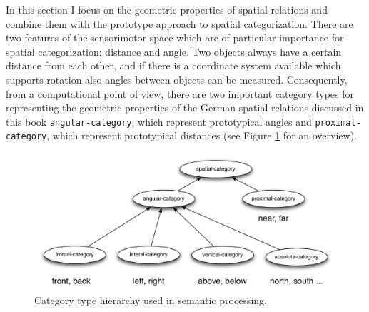 In this section I focus on the geometric properties of spatial relations 
and combine them with the prototype approach to spatial categorization. 
There are two features of the sensorimotor space which are of particular
importance for spatial categorization: distance and angle. Two objects 
always have a certain distance from each other, and if there is a
coordinate system available which supports rotation also angles 
between objects can be measured. 
Consequently, from a computational point of view, there are two 
important category types for representing the geometric properties 
of the German spatial relations discussed in this book {\footnotesize\tt angular-category}, 
which represent prototypical angles and {\footnotesize\tt proximal-category}, 
which represent prototypical distances (see Figure \ref{f:category-hierarchy} for an overview).

\begin{figure}
\includegraphics[width=1\columnwidth]{figs/category-hierarchy.pdf}
\caption[Category type hierarchy]{Category type hierarchy 
used in semantic processing.}
\label{f:category-hierarchy}
\end{figure}

